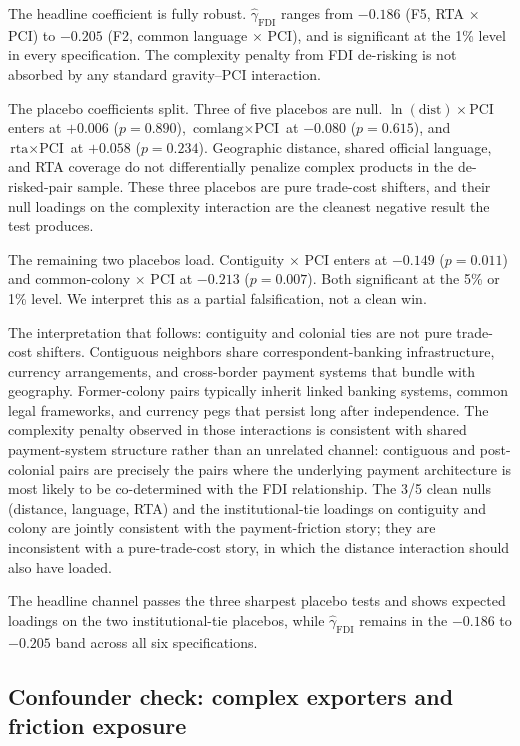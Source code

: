 The headline coefficient is fully robust. $\hat{\gamma}_{\text{FDI}}$ ranges from $-0.186$ (F5, RTA $\times$ PCI) to $-0.205$ (F2, common language $\times$ PCI), and is significant at the 1\% level in every specification. The complexity penalty from FDI de-risking is not absorbed by any standard gravity--PCI interaction.

The placebo coefficients split. Three of five placebos are null. $\ln(\text{dist}) \times \text{PCI}$ enters at $+0.006$ ($p = 0.890$), $\text{comlang} \times \text{PCI}$ at $-0.080$ ($p = 0.615$), and $\text{rta} \times \text{PCI}$ at $+0.058$ ($p = 0.234$). Geographic distance, shared official language, and RTA coverage do not differentially penalize complex products in the de-risked-pair sample. These three placebos are pure trade-cost shifters, and their null loadings on the complexity interaction are the cleanest negative result the test produces.

The remaining two placebos load. Contiguity $\times$ PCI enters at $-0.149$ ($p = 0.011$) and common-colony $\times$ PCI at $-0.213$ ($p = 0.007$). Both significant at the 5\% or 1\% level. We interpret this as a partial falsification, not a clean win.

The interpretation that follows: contiguity and colonial ties are not pure trade-cost shifters. Contiguous neighbors share correspondent-banking infrastructure, currency arrangements, and cross-border payment systems that bundle with geography. Former-colony pairs typically inherit linked banking systems, common legal frameworks, and currency pegs that persist long after independence. The complexity penalty observed in those interactions is consistent with shared payment-system structure rather than an unrelated channel: contiguous and post-colonial pairs are precisely the pairs where the underlying payment architecture is most likely to be co-determined with the FDI relationship. The 3/5 clean nulls (distance, language, RTA) and the institutional-tie loadings on contiguity and colony are jointly consistent with the payment-friction story; they are inconsistent with a pure-trade-cost story, in which the distance interaction should also have loaded.

The headline channel passes the three sharpest placebo tests and shows expected loadings on the two institutional-tie placebos, while $\hat{\gamma}_{\text{FDI}}$ remains in the $-0.186$ to $-0.205$ band across all six specifications.

\subsection{Confounder check: complex exporters and friction exposure}
\label{subsec:falsification_confounder}

